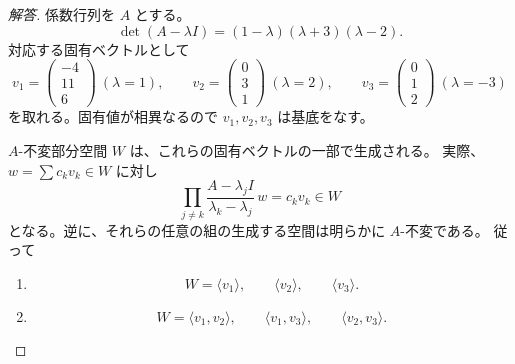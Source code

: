 \begin{proof}[解答]
係数行列を $A$ とする。
\[
\det(A-\lambda I)
=(1-\lambda)(\lambda+3)(\lambda-2).
\]
対応する固有ベクトルとして
\[
v_1=\begin{pmatrix}-4\\11\\6\end{pmatrix}\ (\lambda=1),\qquad
v_2=\begin{pmatrix}0\\3\\1\end{pmatrix}\ (\lambda=2),\qquad
v_3=\begin{pmatrix}0\\1\\2\end{pmatrix}\ (\lambda=-3)
\]
を取れる。固有値が相異なるので $v_1,v_2,v_3$ は基底をなす。

$A$-不変部分空間 $W$ は、これらの固有ベクトルの一部で生成される。
実際、$w=\sum c_kv_k\in W$ に対し
\[
\prod_{j\ne k}\frac{A-\lambda_jI}{\lambda_k-\lambda_j}\,w=c_kv_k\in W
\]
となる。逆に、それらの任意の組の生成する空間は明らかに $A$-不変である。
従って
\begin{enumerate}
  \item[(1)]
  \[
  W=\langle v_1\rangle,\qquad\langle v_2\rangle,\qquad\langle v_3\rangle.
  \]

  \item[(2)]
  \[
  W=\langle v_1,v_2\rangle,\qquad
  \langle v_1,v_3\rangle,\qquad
  \langle v_2,v_3\rangle.
  \]
\end{enumerate}
\end{proof}

